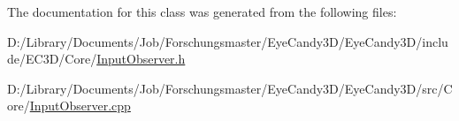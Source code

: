 The documentation for this class was generated from the following files\+:\begin{DoxyCompactItemize}
\item 
D\+:/\+Library/\+Documents/\+Job/\+Forschungsmaster/\+Eye\+Candy3\+D/\+Eye\+Candy3\+D/include/\+E\+C3\+D/\+Core/\mbox{\hyperlink{_input_observer_8h}{Input\+Observer.\+h}}\item 
D\+:/\+Library/\+Documents/\+Job/\+Forschungsmaster/\+Eye\+Candy3\+D/\+Eye\+Candy3\+D/src/\+Core/\mbox{\hyperlink{_input_observer_8cpp}{Input\+Observer.\+cpp}}\end{DoxyCompactItemize}
